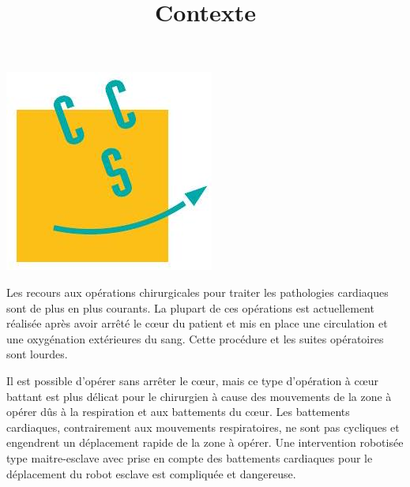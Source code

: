 \documentclass[10pt]{article}
\title{Contexte }
\author{}
\date{}
\begin{document}
\maketitle
\begin{center}
\includegraphics[max width=\textwidth]{2023_07_26_54f5e859400a10e656ddg-01}
\end{center}

Les recours aux opérations chirurgicales pour traiter les pathologies cardiaques sont de plus en plus courants. La plupart de ces opérations est actuellement réalisée après avoir arrêté le cœur du patient et mis en place une circulation et une oxygénation extérieures du sang. Cette procédure et les suites opératoires sont lourdes.

Il est possible d'opérer sans arrêter le cœur, mais ce type d'opération à cœur battant est plus délicat pour le chirurgien à cause des mouvements de la zone à opérer dûs à la respiration et aux battements du cœur. Les battements cardiaques, contrairement aux mouvements respiratoires, ne sont pas cycliques et engendrent un déplacement rapide de la zone à opérer. Une intervention robotisée type maitre-esclave avec prise en compte des battements cardiaques pour le déplacement du robot esclave est compliquée et dangereuse.
\end{document}
